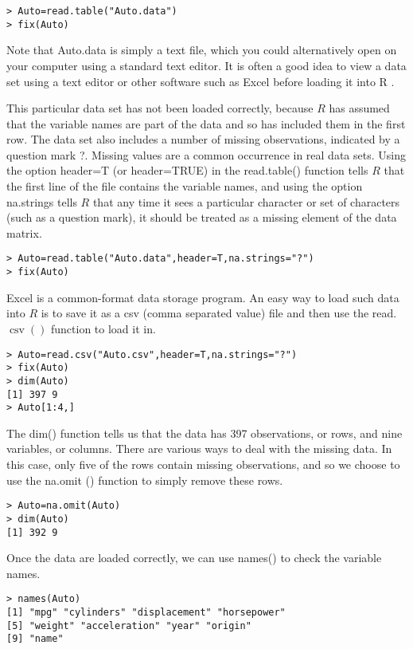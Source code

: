 \documentclass[10pt]{article}
\begin{document}
\begin{verbatim}
> Auto=read.table("Auto.data")
> fix(Auto)
\end{verbatim}

Note that Auto.data is simply a text file, which you could alternatively open on your computer using a standard text editor. It is often a good idea to view a data set using a text editor or other software such as Excel before loading it into R .

This particular data set has not been loaded correctly, because $R$ has assumed that the variable names are part of the data and so has included them in the first row. The data set also includes a number of missing observations, indicated by a question mark ?. Missing values are a common occurrence in real data sets. Using the option header=T (or header=TRUE) in the read.table() function tells $R$ that the first line of the file contains the variable names, and using the option na.strings tells $R$ that any time it sees a particular character or set of characters (such as a question mark), it should be treated as a missing element of the data matrix.

\begin{verbatim}
> Auto=read.table("Auto.data",header=T,na.strings="?")
> fix(Auto)
\end{verbatim}

Excel is a common-format data storage program. An easy way to load such data into $R$ is to save it as a csv (comma separated value) file and then use the read. $\operatorname{csv}()$ function to load it in.

\begin{verbatim}
> Auto=read.csv("Auto.csv",header=T,na.strings="?")
> fix(Auto)
> dim(Auto)
[1] 397 9
> Auto[1:4,]
\end{verbatim}

The dim() function tells us that the data has 397 observations, or rows, and nine variables, or columns. There are various ways to deal with the missing data. In this case, only five of the rows contain missing observations, and so we choose to use the na.omit () function to simply remove these rows.

\begin{verbatim}
> Auto=na.omit(Auto)
> dim(Auto)
[1] 392 9
\end{verbatim}

Once the data are loaded correctly, we can use names() to check the variable names.

\begin{verbatim}
> names(Auto)
[1] "mpg" "cylinders" "displacement" "horsepower"
[5] "weight" "acceleration" "year" "origin"
[9] "name"
\end{verbatim}
\end{document}
